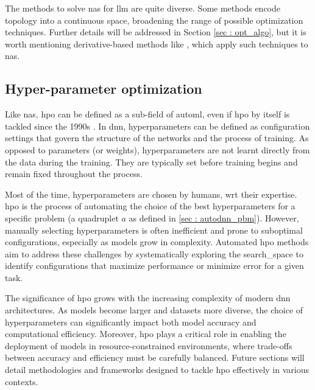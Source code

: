 The methods to solve \acrshort{nas} for \acrshort{llm} are quite diverse. Some methods encode topology into a continuous space, broadening the range of possible optimization techniques. Further details will be addressed in Section \ref{sec : opt_algo}, but it is worth mentioning derivative-based methods like \cite{liu_darts_2019}, which apply such techniques to \acrshort{nas}.

\subsection{Hyper-parameter optimization}
\label{sec : hpo}
Like \acrshort{nas}, \acrshort{hpo} can be defined as a sub-field of \acrshort{automl}, even if \acrshort{hpo} by itself is tackled since the 1990s \cite{feurer_hyperparameter_2019}. In \acrfull{dnn}, \glspl{hyperparameter} can be defined as configuration settings that govern the structure of the networks and the process of training. As opposed to parameters (or weights), \glspl{hyperparameter} are not learnt directly from the data during the training. They are typically set before training begins and remain fixed throughout the process.

Most of the time, \glspl{hyperparameter} are chosen by humans, \acrshort{wrt} their expertise. \acrshort{hpo} is the process of automating the choice of the best \glspl{hyperparameter} for a specific problem (a quadruplet $a$ as defined in \ref{sec : autodnn_pbm}). However, manually selecting \glspl{hyperparameter} is often inefficient and prone to suboptimal configurations, especially as models grow in complexity. Automated \acrshort{hpo} methods aim to address these challenges by systematically exploring the \gls{search_space} to identify configurations that maximize performance or minimize error for a given task.

The significance of \acrshort{hpo} grows with the increasing complexity of modern \acrshort{dnn} architectures. As models become larger and datasets more diverse, the choice of \glspl{hyperparameter} can significantly impact both model accuracy and computational efficiency. Moreover, \acrshort{hpo} plays a critical role in enabling the deployment of models in resource-constrained environments, where trade-offs between accuracy and efficiency must be carefully balanced. Future sections will detail methodologies and frameworks designed to tackle \acrshort{hpo} effectively in various contexts.




